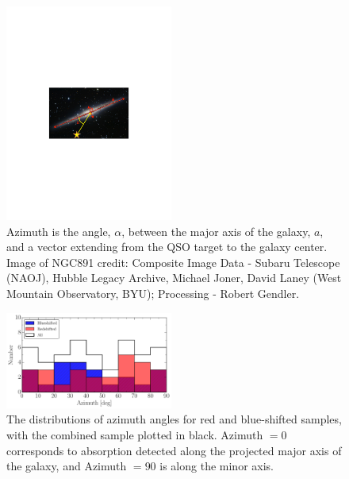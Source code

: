\documentclass[twocolumn,tighten]{aastex6}
\providecommand{\DIFaddbeginFL}{} %
\providecommand{\DIFaddendFL}{} %
\providecommand{\DIFdelbeginFL}{} %
\providecommand{\DIFdelendFL}{} %
\begin{document}
\begin{figure}[ht!]
        \centering
        \includegraphics[width=0.49\textwidth]{fig11.pdf}
        \caption{\DIFdelbeginFL %
\DIFdelendFL \DIFaddbeginFL \small{Azimuth is the angle, $\alpha$, between the major axis of the galaxy, $a$, and a vector extending from the QSO target to the galaxy center. Image of NGC891 credit: Composite Image Data - Subaru Telescope (NAOJ), Hubble Legacy Archive, Michael Joner, David Laney (West Mountain Observatory, BYU); Processing - Robert Gendler.}\DIFaddendFL }
        \label{azimuth_illustration}
        \vspace{5pt}
\end{figure} 

\begin{figure}[ht!]
        \centering
        \includegraphics[width=0.49\textwidth]{fig12.pdf}
        \caption{\small{The distributions of azimuth angles for red and blue-shifted samples, with the combined sample plotted in black. Azimuth $= 0$ corresponds to absorption detected along the projected major axis of the galaxy, and Azimuth $= 90$ is along the minor axis.}}
        \label{azimuth_dist}
        \vspace{5pt}
\end{figure}
\end{document}
